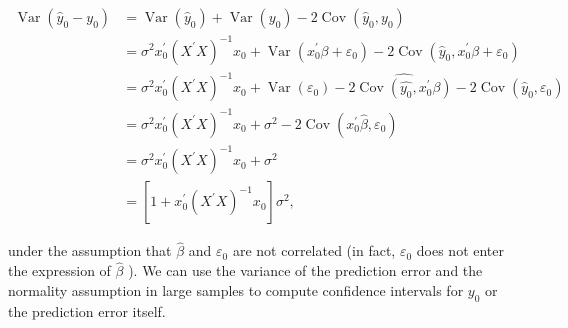 $$
\begin{aligned}
\operatorname{Var}\left(\widehat{y}_{0}-y_{0}\right) & =\operatorname{Var}\left(\widehat{y}_{0}\right)+\operatorname{Var}\left(y_{0}\right)-2 \operatorname{Cov}\left(\widehat{y}_{0}, y_{0}\right) \\
& =\sigma^{2} x_{0}^{\prime}\left(X^{\prime} X\right)^{-1} x_{0}+\operatorname{Var}\left(x_{0}^{\prime} \beta+\varepsilon_{0}\right)-2 \operatorname{Cov}\left(\widehat{y}_{0}, x_{0}^{\prime} \beta+\varepsilon_{0}\right) \\
& =\sigma^{2} x_{0}^{\prime}\left(X^{\prime} X\right)^{-1} x_{0}+\operatorname{Var}\left(\varepsilon_{0}\right)-2 \widehat{\operatorname{Cov}\left(\widehat{y_{0}}, x_{0}^{\prime} \beta\right)}-2 \operatorname{Cov}\left(\widehat{y}_{0}, \varepsilon_{0}\right) \\
& =\sigma^{2} x_{0}^{\prime}\left(X^{\prime} X\right)^{-1} x_{0}+\sigma^{2}-2 \operatorname{Cov}\left(x_{0}^{\prime} \widehat{\beta}, \varepsilon_{0}\right) \\
& =\sigma^{2} x_{0}^{\prime}\left(X^{\prime} X\right)^{-1} x_{0}+\sigma^{2} \\
& =\left[1+x_{0}^{\prime}\left(X^{\prime} X\right)^{-1} x_{0}\right] \sigma^{2},
\end{aligned}
$$

under the assumption that $\widehat{\beta}$ and $\varepsilon_{0}$ are not correlated (in fact, $\varepsilon_{0}$ does not enter the expression of $\widehat{\beta}$ ). We can use the variance of the prediction error and the normality assumption in large samples to compute confidence intervals for $y_{0}$ or the prediction error itself.